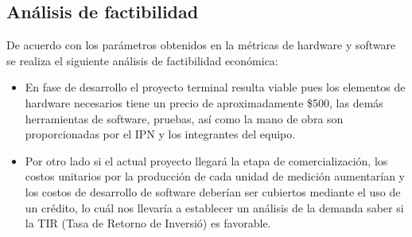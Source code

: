 \subsection{Análisis de factibilidad}
De acuerdo con los parámetros obtenidos en la métricas de hardware y software se realiza el siguiente análisis de factibilidad económica:
\begin{itemize}
	\item En fase de desarrollo el proyecto terminal resulta viable pues los elementos de hardware necesarios tiene  un precio de aproximadamente \$500, las demás herramientas de software, pruebas, así como la mano de obra son proporcionadas por el IPN y los integrantes del equipo.
	\item Por otro lado si el actual proyecto llegará la etapa de comercialización, los costos unitarios por la producción de cada unidad de medición aumentarían y los costos de desarrollo de software deberían ser cubiertos mediante el uso de un crédito, lo cuál nos llevaría a establecer un análisis de la demanda saber si la TIR (Tasa de Retorno de Inversió) es favorable.
\end{itemize}